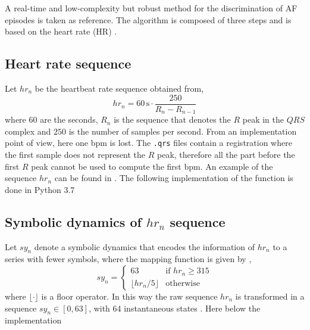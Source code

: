 A real-time and low-complexity but robust method for the discrimination of AF episodes is taken as reference. The algorithm is composed of three steps and is based on the heart rate (HR) \cite[p. 2]{zhou2015}.


\subsection{Heart rate sequence}
Let $hr_n$ be the heartbeat rate sequence obtained from,
\begin{equation}
hr_n = 60\, \text{s} \cdot \frac{250}{R_n - R_{n-1}}
\end{equation}
where $60$ are the seconds, $R_n$ is the sequence that denotes the $R$ peak in the $QRS$ complex and $250$ is the number of samples per second. From an implementation point of view, here one bpm is lost. The \verb|.qrs| files contain a registration where the first sample does not represent the $R$ peak, therefore all the part before the first $R$ peak cannot be used to compute the first bpm. An example of the sequence $hr_n$ can be found in . The following implementation of the function is done in Python 3.7

\subsection{Symbolic dynamics of $hr_n$ sequence}
Let $sy_n$ denote a symbolic dynamics that encodes the information of $hr_n$ to a series with fewer symbols, where the mapping function is given by \cite[p. 3]{zhou2015},
\begin{equation}
sy_n = \begin{cases}
63 & \text{if $hr_n \ge 315$} \\
\lfloor hr_n / 5 \rfloor & \text{otherwise}
\end{cases}
\end{equation}
where $\lfloor \cdot \rfloor$ is a floor operator. In this way the raw sequence $hr_n$ is transformed in a sequence $sy_n \in [0, 63]$, with 64 instantaneous states . Here below the implementation

